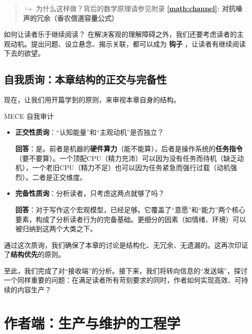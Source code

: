 \documentclass[11pt, a4paper]{ctexart}
\newcommand{\lowfreq}[1]{%
	{\Large\bfseries\color{red!60!black} #1}%
}
\newcommand{\mathref}[2]{%
	\begin{quote}
		\small\color{gray}
		$\hookrightarrow$ 为什么这样做？背后的数学原理请参见附录 \textbf{\ref{#1}: #2}
	\end{quote}
}
\begin{document}
	\mathref{math:channel}{对抗噪声的冗余（香农信道容量公式）}
	
	\begin{thinkbox}{如何让读者乐于继续阅读？}
		在解决客观的理解障碍之外，我们还要考虑读者的主观动机。提出问题、设立悬念、揭示关联，都可以成为\lowfreq{钩子}，让读者有继续阅读下去的欲望。
	\end{thinkbox}
	
	
	\subsection{自我质询：本章结构的正交与完备性}
	
	现在，让我们用开篇学到的原则，来审视本章自身的结构。
	
	\begin{strategybox}{MECE 自我审计}
		\begin{itemize}
			\item \textbf{正交性质询}：“认知能量”和“主观动机”是否独立？
			
			\textbf{回答}：是。前者是机器的\textbf{硬件算力}（能不能算），后者是操作系统的\textbf{任务指令}（要不要算）。一个顶配CPU（精力充沛）可以因为没有任务而待机（缺乏动机），一个老旧CPU（精力不足）也可以因为任务紧急而强行过载（动机强烈）。二者是正交维度。
			
			\item \textbf{完备性质询}：分析读者，只考虑这两点就够了吗？
			
			\textbf{回答}：对于写作这个宏观模型，已经足够。它覆盖了“意愿”和“能力”两个核心要素，构成了分析读者行为的完备基础。更细分的因素（如情绪、环境）可以被归纳到这两个大类之下。
		\end{itemize}
		
		通过这次质询，我们确保了本章的讨论是结构化、无冗余、无遗漏的。这再次印证了\textbf{结构优先}的原则。
	\end{strategybox}
	
	至此，我们完成了对“接收端”的分析。接下来，我们将转向信息的“发送端”，探讨一个同样重要的问题：在满足读者所有苛刻要求的同时，作者如何实现高效、可持续的内容生产？
	
	
	\newpage
	\section{作者端：生产与维护的工程学}
	
\end{document}
